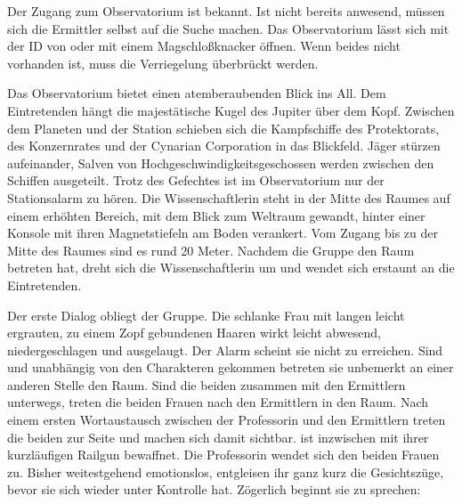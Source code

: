 
Der Zugang zum Observatorium ist \ml{} bekannt. Ist \ml{} nicht bereits anwesend, müssen sich die Ermittler selbst auf die Suche machen. Das Observatorium lässt sich mit der ID von \ml{} oder mit einem Magschloßknacker öffnen. Wenn beides nicht vorhanden ist, muss die Verriegelung überbrückt werden.

Das Observatorium bietet einen atemberaubenden Blick ins All. Dem Eintretenden hängt die majestätische Kugel des Jupiter über dem Kopf. Zwischen dem Planeten und der Station schieben sich die Kampfschiffe des Protektorats, des Konzernrates und der Cynarian Corporation in das Blickfeld. Jäger stürzen aufeinander, Salven von Hochgeschwindigkeitsgeschossen werden zwischen den Schiffen ausgeteilt. Trotz des Gefechtes ist im Observatorium nur der Stationsalarm zu hören. Die Wissenschaftlerin steht in der Mitte des Raumes auf einem erhöhten Bereich, mit dem Blick zum Weltraum gewandt, hinter einer Konsole mit ihren Magnetstiefeln am Boden verankert. Vom Zugang bis zu der Mitte des Raumes sind es rund 20 Meter. Nachdem die Gruppe den Raum betreten hat, dreht sich die Wissenschaftlerin um und wendet sich erstaunt an die Eintretenden.


Der erste Dialog obliegt der Gruppe. Die schlanke Frau mit langen leicht ergrauten, zu einem Zopf gebundenen Haaren wirkt leicht abwesend, niedergeschlagen und ausgelaugt. Der Alarm scheint sie nicht zu erreichen. Sind \xl{} und \ml{} unabhängig von den Charakteren gekommen betreten sie unbemerkt an einer anderen Stelle den Raum. Sind die beiden zusammen mit den Ermittlern unterwegs, treten die beiden Frauen nach den Ermittlern in den Raum. Nach einem ersten Wortaustausch zwischen der Professorin und den Ermittlern treten die beiden zur Seite und machen sich damit sichtbar. \xl{} ist inzwischen mit ihrer kurzläufigen Railgun bewaffnet. Die Professorin wendet sich den beiden Frauen zu. Bisher weitestgehend emotionslos, entgleisen ihr ganz kurz die Gesichtszüge, bevor sie sich wieder unter Kontrolle hat. Zögerlich beginnt sie zu sprechen:


